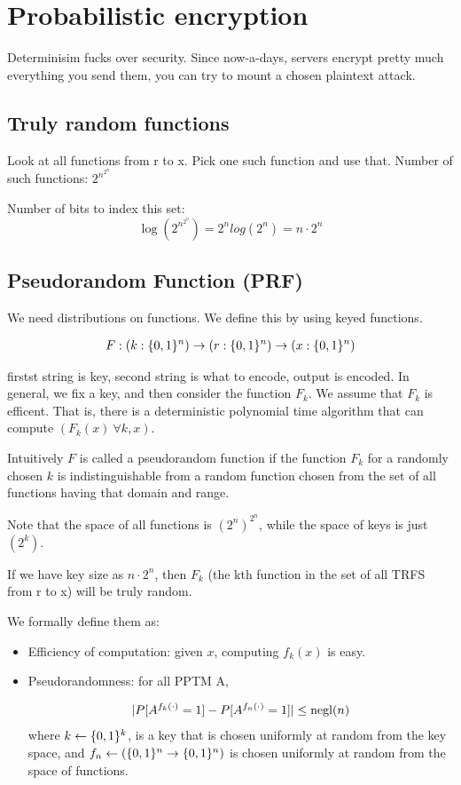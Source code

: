 \chapter{Probabilistic encryption}

Determinisim fucks over security. Since now-a-days, servers encrypt pretty much
everything you send them, you can try to mount a chosen plaintext attack.


\section{Truly random functions} 
Look at all functions from r to x. Pick one such function and use that. Number
of such functions: $2^{n^{2^n}}$ 

Number of bits to index this set: $$\log
(2^{n^{2^n}}) = 2^n log(2^n) = n \cdot 2^n$$

\section{Pseudorandom Function (PRF)}
We need distributions on functions. We define this by using keyed functions.

\begin{align*}
F: (k: \{0, 1\}^n) \to (r : \{0, 1\}^n) \to (x: \{0, 1\}^n)
\end{align*}

firstst string is key, second string is what to encode, output is encoded.
In general, we fix a key, and then consider the function $F_k$. We assume
that $F_k$ is efficent. That is, there is a deterministic polynomial time
algorithm that can compute $(F_k(x)~\forall k, x)$.

Intuitively $F$ is called a pseudorandom function if the function $F_k$
for a randomly chosen $k$ is indistinguishable from a random function chosen
from the set of all functions having that domain and range. 

Note that the space of all functions is $(2^n)^{2^n}$, while the space of keys
is just $(2^k)$.


If we have key size as $n \cdot 2^n$, then $F_k$ (the kth function in the set
of all TRFS from r to x) will be truly random.

We formally define them as:
\begin{itemize}
\item Efficiency of computation:  given $x$, computing $f_k(x)$ is easy.
\item Pseudorandomness: for all PPTM A, 

\begin{align*}
|P [ A^{f_k(\cdot)} = 1 ] - P [ A^{f_n(\cdot)} = 1 ]| \leq \operatorname{negl}(n)
\end{align*} 
where $k \leftarrow \{0, 1\}^k$, is a key that is chosen uniformly at
random from the key space, and $f_n \leftarrow (\{0, 1\}^n \rightarrow \{0, 1\}^n)$ 
is chosen uniformly at random from the space of functions.
\end{itemize}

